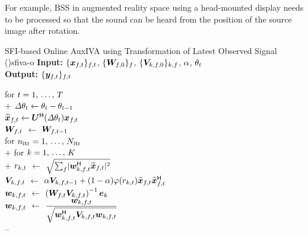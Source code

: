 \documentclass[sip,biber]{now-journal}
\begin{document}
For example, BSS in augmented reality space using a head-mounted display needs to be processed so that the sound can be heard from the position of the source image after rotation.
\begin{algorithm}{SFI-based Online AuxIVA using Transformation of Latest Observed Signal (\SFIIVAo)}{sfiva-o}
  \textbf{Input:} $\{\Obs _{\ft}\} _{\ft}$, $ \{\bm{W} _{f,0}\}_{f}$, $\{\bm{V} _{k,f,0}\}_{k,f}$, $\alpha$, $\theta _{t}$ \\
  \textbf{Output:} $\{\Est _{\ft}\} _{\ft}$
  \begin{pseudo}
    for $t = 1,\, \dots,\, T$ \\+
    $\varDelta \theta _{t} \gets \theta _{t} - \theta _{t - 1}$ \\
    $\refpos{\Obs} _{\ft} \gets \rotMat ^{\hermite} (\varDelta \rotSpat _{\tframe}) \Obs _{\ft}$ \ct{$\forall \freq$} \\
      {$\Demix _{\ft}$} $\gets$ $\Demix _{\ft[-1]}$ \ct{$\forall \freq$} \\
      for $n _{\mathrm{itr}} = 1,\, \dots,\, N _{\mathrm{itr}}$ \\+
        for $k = 1,\, \dots,\, K$ \\+
          {$r _{k,t}$} $\gets$ $\sqrt{\sum _{\freq} \abs{\demix _{\src,\ft} ^{\hermite} \refpos{\Obs} _{\ft}} ^2}$ \ct{\eqref{eq:var}} \\
          {$\cov _{\src,\ft}    $} $\gets$ $\forget \cov _{\src,\ft[-1]} + (1 - \forget) \weight(\var _{\src,\tframe}) \refpos{\Obs} _{\ft} \refpos{\Obs} _{\ft} ^{\hermite}$ \ct{\eqref{eq:cov}, $\forall \freq$} \\
          {$\demix _{\src,\ft}$} $\gets$ $\left(\Demix _{\ft} \cov _{\src,\ft}\right) ^{-1} \eye _{\src}$ \ct{\eqref{eq:ip:proj}, $\forall \freq$} \\
          {$\demix _{\src,\ft}$} $\gets$ $\dfrac{\demix _{\src,\ft}}{\sqrt{\demix _{\src,\ft} ^{\hermite} \cov _{\src,\ft} \demix _{\src,\ft}}}$ \ct{\eqref{eq:ip:norm}, $\forall \freq$} \\--


\end{pseudo}
\end{algorithm}
\end{document}
